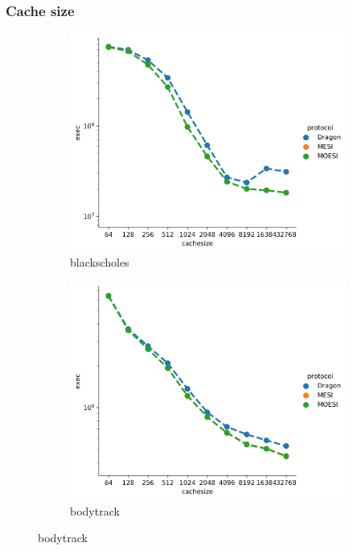 \documentclass[nonacm,acmsmall,screen,11pt]{acmart}
\begin{document}
\subsubsection{Cache size}
\begin{figure}[htb!]
  \centering
  \begin{subfigure}{0.32\textwidth}
    \includegraphics[width=\textwidth]{cachesize-blackscholes}
    \caption{blackscholes}
  \end{subfigure}
  \begin{subfigure}{0.32\textwidth}
    \includegraphics[width=\columnwidth]{cachesize-bodytrack}
    \caption{bodytrack}
  \end{subfigure}

\end{figure}
\end{document}
